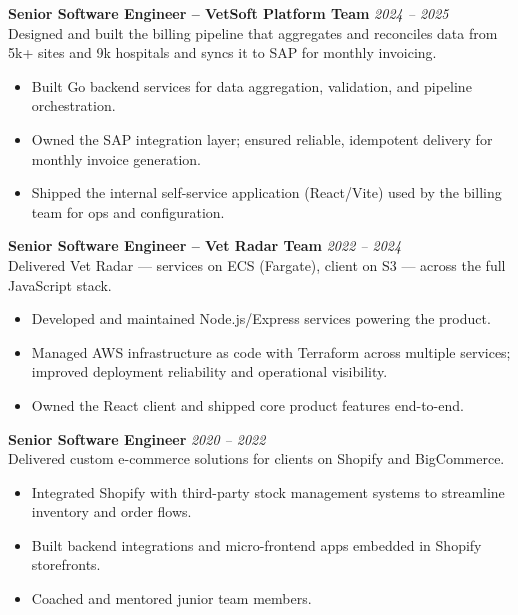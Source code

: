\documentclass{resume}
\begin{document}
\vspace{1em}

\textbf{Senior Software Engineer – VetSoft Platform Team} \hfill \textit{2024 -- 2025} \\
Designed and built the billing pipeline that aggregates and reconciles data from 5k+ sites and 9k hospitals and syncs it to SAP for monthly invoicing.
\begin{itemize}
  \item Built Go backend services for data aggregation, validation, and pipeline orchestration.
  \item Owned the SAP integration layer; ensured reliable, idempotent delivery for monthly invoice generation.
  \item Shipped the internal self-service application (React/Vite) used by the billing team for ops and configuration.
\end{itemize}

\vspace{1em}

\textbf{Senior Software Engineer – Vet Radar Team} \hfill \textit{2022 -- 2024} \\
Delivered Vet Radar — services on ECS (Fargate), client on S3 — across the full JavaScript stack.
\begin{itemize}
  \item Developed and maintained Node.js/Express services powering the product.
  \item Managed AWS infrastructure as code with Terraform across multiple services; improved deployment reliability and operational visibility.
  \item Owned the React client and shipped core product features end-to-end.
\end{itemize}

\vspace{1em}

\vspace{1em}
\textbf{Senior Software Engineer} \hfill \textit{2020 -- 2022} \\
Delivered custom e-commerce solutions for clients on Shopify and BigCommerce.
\begin{itemize}
  \item Integrated Shopify with third-party stock management systems to streamline inventory and order flows.
  \item Built backend integrations and micro-frontend apps embedded in Shopify storefronts.
  \item Coached and mentored junior team members.
\end{itemize}
\end{document}
